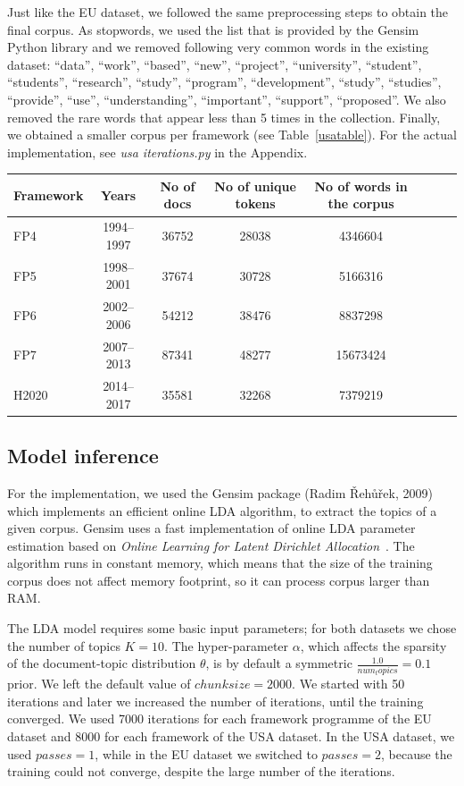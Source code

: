\documentclass[12pt]{report}
\begin{document}
Just like the EU dataset, we followed the same preprocessing steps to obtain the
final corpus. As stopwords, we used the list that is provided by the Gensim
Python library and we removed following very common words in the existing
dataset: ``data'', ``work'', ``based'', ``new'', ``project'', ``university'', ``student'', ``students'', ``research'', ``study'', ``program'', ``development'', ``study'', ``studies'', ``provide'', ``use'', ``understanding'', ``important'', ``support'', ``proposed''. We also removed the rare words that appear less than 5 
times in the collection. Finally, we obtained a smaller corpus per framework 
(see Table~\ref{usatable}). 
For the actual implementation, see \emph{usa iterations.py} in the Appendix.

\begin{center}
\begin{tabular}{l*{6}{c}r}
Framework& Years & No of docs & No of unique tokens & No of words in the corpus \\
\hline
FP4 & 1994--1997 & 36752 & 28038 & 4346604 \\
FP5 & 1998--2001 & 37674 & 30728 & 5166316 \\
FP6 & 2002--2006 & 54212 & 38476 & 8837298 \\
FP7 & 2007--2013 & 87341 & 48277 & 15673424 \\
H2020 & 2014--2017 & 35581 & 32268 & 7379219 \\
\end{tabular}
\label{usatable}
\end{center}

\subsection{Model inference}
\label{modelinference}
For the implementation, we used the Gensim package (Radim Řehůřek,
2009)~\cite{rehurek_lrec} which implements an efficient online LDA algorithm, to
extract the topics of a given corpus. Gensim uses a fast implementation of
online LDA parameter estimation based on \emph{Online Learning for Latent Dirichlet
Allocation}~\cite{onlineLDAvb}. The algorithm runs in constant memory, which
means that the size of the training corpus does not affect memory footprint, so
it can process corpus larger than RAM.

The LDA model requires some basic input parameters; for both datasets we chose
the number of topics $K=10$. The hyper-parameter $\alpha$, which affects the
sparsity of the document-topic distribution $\theta$, is by default a symmetric
$\frac{1.0}{num_topics} = 0.1$ prior. We left the default value of $chunksize=2000$. We
started with 50 iterations and later we increased the number of iterations,
until the training converged. We used 7000 iterations for each framework
programme of the EU dataset and 8000 for each framework of the USA dataset. In
the USA dataset, we used $passes=1$, while in the EU dataset we switched to
$passes=2$, because the training could not converge, despite the large number of
the iterations.
\end{document}
